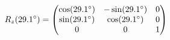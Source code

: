 \documentclass[preview]{standalone}
\begin{document}
\begin{align*}
\special{dvisvgm:raw <g id='unique000'>}R_z(29.1^\circ) = \begin{pmatrix} \cos(29.1^\circ) & -\sin(29.1^\circ) & 0 \\ \sin(29.1^\circ) & \cos(29.1^\circ) & 0 \\ 0 & 0 & 1 \end{pmatrix}\special{dvisvgm:raw </g>}
\end{align*}
\end{document}
